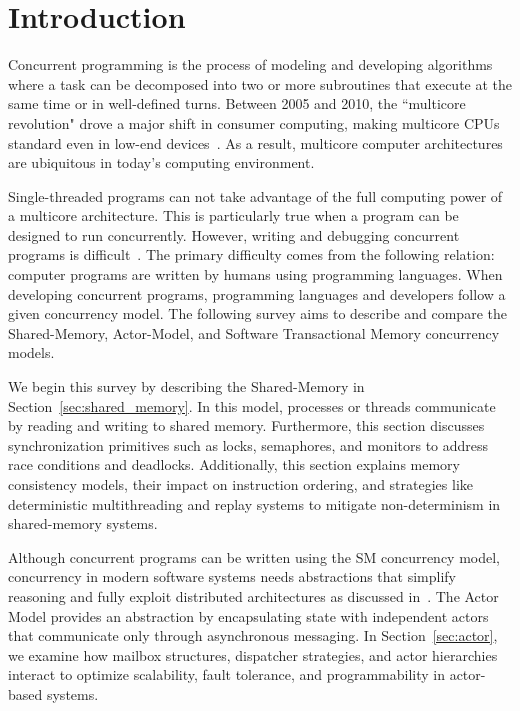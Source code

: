 \section{Introduction\label{sec:introduction}}
Concurrent programming is the process of modeling and
developing algorithms where a task can be decomposed into
two or more subroutines that execute at the same time or in well-defined turns.
Between 2005 and 2010, the ``multicore revolution" drove a major shift in consumer computing,
making multicore CPUs standard even in low-end devices~\cite{alseqyani2023history}.
As a result, multicore computer architectures are ubiquitous in today’s computing environment.

Single-threaded programs can not take advantage of the full computing power of a multicore architecture.
This is particularly true when a program can be designed to run concurrently.
However, writing and debugging concurrent programs is difficult~\cite{huang2016debuggingConcurrentPrograms}.
The primary difficulty comes from the following relation: computer programs
are written by humans using programming languages. 
When developing concurrent programs, programming languages and developers
follow a given concurrency model. The following survey aims to describe
and compare the Shared-Memory, Actor-Model, and Software Transactional Memory
concurrency models.

We begin this survey by describing the Shared-Memory
in Section~\ref{sec:shared_memory}.
In this model, processes or threads communicate by reading and writing
to shared memory.
Furthermore, this section discusses 
synchronization primitives such as locks, semaphores,
and monitors to address race conditions and deadlocks.
Additionally, this section explains memory consistency models,
their impact on instruction ordering,
and strategies like deterministic multithreading
and replay systems to mitigate
non-determinism in shared-memory systems.

Although concurrent programs can be written using the SM concurrency
model, concurrency in modern software systems needs abstractions
that simplify reasoning and fully exploit distributed
architectures as discussed in~\cite{10.1145/357980.358021}.
The Actor Model provides an abstraction by encapsulating state
with independent actors that communicate only through
asynchronous messaging. In Section~\ref{sec:actor},
we examine how mailbox structures, dispatcher strategies,
and actor hierarchies interact to optimize scalability, fault tolerance,
and programmability in actor-based systems.


